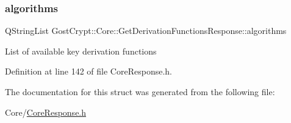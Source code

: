 \subsubsection{\texorpdfstring{algorithms}{algorithms}}
{\footnotesize\ttfamily Q\+String\+List Gost\+Crypt\+::\+Core\+::\+Get\+Derivation\+Functions\+Response\+::algorithms}

List of available key derivation functions 

Definition at line 142 of file Core\+Response.\+h.



The documentation for this struct was generated from the following file\+:\begin{DoxyCompactItemize}
\item 
Core/\hyperlink{_core_response_8h}{Core\+Response.\+h}\end{DoxyCompactItemize}
